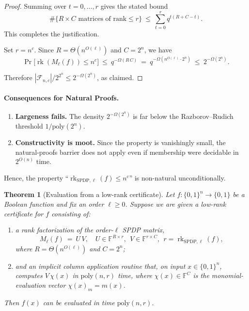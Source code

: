 \documentclass[12pt]{article}
\newtheorem{theorem}{Theorem}
\theoremstyle{definition}
\theoremstyle{definition}
\theoremstyle{remark}
\theoremstyle{remark}
\begin{document}
\begin{proof}
Summing over $t=0,\dots,r$ gives the stated bound
\[
\#\{R\times C\text{ matrices of rank}\le r\} \ \le\ \sum_{t=0}^r q^{t(R+C-t)}.
\]
This completes the justification.

Set $r=n^c$. Since $R=\Theta(n^{O(\ell)})$ and $C=2^n$, we have
\[
\Pr\!\bigl[\operatorname{rk}(M_\ell(f))\le n^c\bigr] \ \le\ q^{-\Omega(R\,C)} \ =\ q^{-\Omega(n^{O(\ell)}\cdot 2^n)} \ \le\ 2^{-\Omega(2^n)}.
\]

Therefore $|\mathcal{F}_{n,c}|/2^{2^n} \le 2^{-\Omega(2^n)}$, as claimed.
\end{proof}

\paragraph{Consequences for Natural Proofs.}

\begin{enumerate}
\item \textbf{Largeness fails.} The density $2^{-\Omega(2^n)}$ is far below the Razborov--Rudich threshold $1/\mathrm{poly}(2^n)$.

\item \textbf{Constructivity is moot.} Since the property is vanishingly small, the natural-proofs barrier does not apply even if membership were decidable in $2^{O(n)}$ time.
\end{enumerate}

Hence, the property ``$\operatorname{rk}_{\mathrm{SPDP},\ell}(f)\le n^c$'' is non-natural unconditionally.

\begin{theorem}[Evaluation from a low-rank certificate]\label{thm:eval-from-certificate}
Let $f:\{0,1\}^n\to\{0,1\}$ be a Boolean function and fix an order $\ell\ge 0$. Suppose we are given a low-rank certificate for $f$ consisting of:
\begin{enumerate}
\item a rank factorization of the order-$\ell$ SPDP matrix,
\[
M_\ell(f) \ =\ U\,V, \quad U\in\mathbb{F}^{R\times r},\ \ V\in\mathbb{F}^{r\times C},\ \ r=\operatorname{rk}_{\mathrm{SPDP},\ell}(f),
\]
where $R=\Theta(n^{O(\ell)})$ and $C=2^n$;

\item and an implicit column application routine that, on input $x\in\{0,1\}^n$, computes $V\,\chi(x)$ in $\mathrm{poly}(n,r)$ time, where $\chi(x)\in\mathbb{F}^C$ is the monomial-evaluation vector $\chi(x)_m = m(x)$.
\end{enumerate}

Then $f(x)$ can be evaluated in time $\mathrm{poly}(n,r)$.
\end{theorem}
\end{document}
